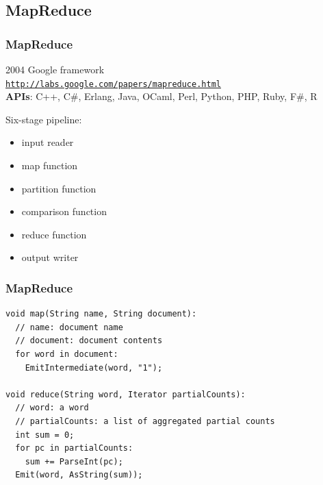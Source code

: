 \documentclass[t]{beamer}
\begin{document}
\subsection{MapReduce}
\begin{frame}
\frametitle{MapReduce}
2004 Google framework\\
\texttt{\url{http://labs.google.com/papers/mapreduce.html}}\\
\textbf{APIs}: C++, C\#, Erlang, Java, OCaml, Perl, Python, PHP, Ruby, F\#, R

\pause \bigskip

Six-stage pipeline:
\begin{itemize}
  \item input reader
  \item map function
  \item partition function
  \item comparison function
  \item reduce function
  \item output writer
\end{itemize}
\end{frame}

\begin{frame}[fragile]
\frametitle{MapReduce}
\begin{verbatim}
void map(String name, String document):
  // name: document name
  // document: document contents
  for word in document:
    EmitIntermediate(word, "1");
 
void reduce(String word, Iterator partialCounts):
  // word: a word
  // partialCounts: a list of aggregated partial counts
  int sum = 0;
  for pc in partialCounts:
    sum += ParseInt(pc);
  Emit(word, AsString(sum));
\end{verbatim}
\end{frame}

\end{document}
